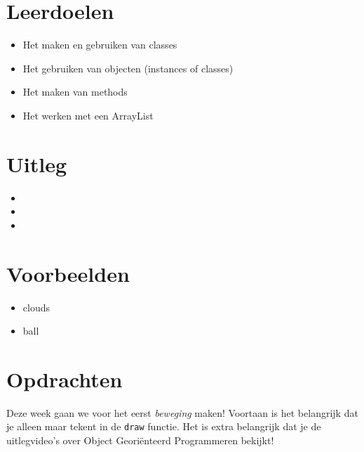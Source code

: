 \documentclass{../qh_exercise}
\begin{document}
\section{Leerdoelen}
\begin{itemize}
    \item Het maken en gebruiken van classes
    \item Het gebruiken van objecten (instances of classes)
    \item Het maken van methods
    \item Het werken met een ArrayList
\end{itemize}

\section{Uitleg}
\begin{itemize}
    \item {}
    \item {}
    \item {}
\end{itemize}

\section{Voorbeelden}
\begin{itemize}
    \item clouds
    \item ball
\end{itemize}

\newpage
\section{Opdrachten}
Deze week gaan we voor het eerst \textit{beweging} maken! Voortaan is het belangrijk dat je alleen maar tekent in de \texttt{draw} functie. Het is extra belangrijk dat je de uitlegvideo's over Object Geori\"enteerd Programmeren bekijkt!
\end{document}
